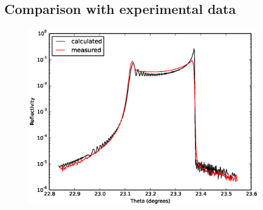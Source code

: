 \documentclass[12pt,oneside,notitlepage,abstracton,a4paper]{scrartcl}
\begin{document}
\subsection{Comparison with experimental data}\label{data}
\begin{figure}[h]
\begin{center}
\includegraphics[width=10cm]{pics/SrTiO3_2.eps}
\caption{}
\label{SrTiO3_2}
\end{center}
\end{figure}


\clearpage 



\nocite{*}
 
{}
\end{document}
